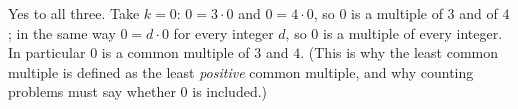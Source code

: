 Yes to all three. Take $k=0$: $0=3\cdot0$ and $0=4\cdot0$, so $0$ is a multiple of $3$ and of $4$; in the same way $0=d\cdot0$ for every integer $d$, so $0$ is a multiple of every integer. In particular $0$ is a common multiple of $3$ and $4$. (This is why the least common multiple is defined as the least \emph{positive} common multiple, and why counting problems must say whether $0$ is included.)
